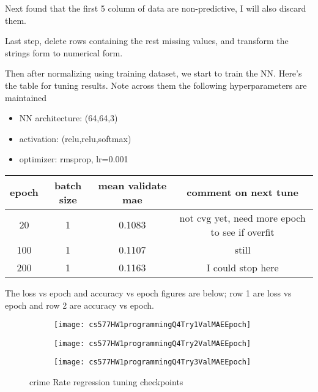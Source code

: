 \documentclass{article}
\begin{document}
Next found that the first 5 column of data are non-predictive, I will also discard them.

Last step, delete rows containing the rest missing values, and transform the strings form to numerical form.

Then after normalizing using training dataset, we start to train the NN. Here's the table for tuning results. Note across them the following hyperparameters are maintained

\begin{itemize}
    \item NN architecture: (64,64,3) 
    \item activation: (relu,relu,softmax) 
    \item optimizer: rmsprop, lr=0.001
\end{itemize}


\begin{center}
    \begin{tabular}{cccc}\hline
        epoch& batch size & mean validate mae & comment on next tune\\ \hline
        20 & 1 & 0.1083 & not cvg yet, need more epoch to see if overfit\\
        100 & 1 & 0.1107 & still\\
        200 & 1 & 0.1163 & I could stop here\\
        \hline
    \end{tabular}
\end{center}

The loss vs epoch and accuracy vs epoch figures are below; row 1 are loss vs epoch and row 2 are accuracy vs epoch.

\begin{figure}[h!]
    \centering
    \begin{subfigure}{.32\textwidth}
        \centering
        \texttt{[image: cs577HW1programmingQ4Try1ValMAEEpoch]}
    \end{subfigure}
    \begin{subfigure}{.32\textwidth}
        \centering
        \texttt{[image: cs577HW1programmingQ4Try2ValMAEEpoch]}
    \end{subfigure}
    \begin{subfigure}{.32\textwidth}
        \centering
        \texttt{[image: cs577HW1programmingQ4Try3ValMAEEpoch]}
    \end{subfigure}
    \caption{crime Rate regression tuning checkpoints}
    \label{fig:crimeRegre}
\end{figure}
\end{document}
